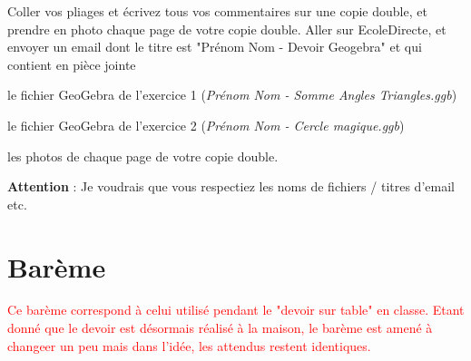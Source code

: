 \documentclass[answers]{exam}
\begin{document}
\begin{questions}

\question Coller vos pliages et écrivez tous vos commentaires sur une copie double, et prendre en photo chaque page de votre copie double.
\question Aller sur EcoleDirecte, et envoyer un email dont le titre est "Prénom Nom - Devoir Geogebra" et qui contient en pièce jointe 
\begin{compactenum}
  \item le fichier GeoGebra de l'exercice 1 (\textit{Prénom Nom - Somme Angles Triangles.ggb}) 
  \item le fichier GeoGebra de l'exercice 2 (\textit{Prénom Nom - Cercle magique.ggb}) 
  \item les photos de chaque page de votre copie double.
\end{compactenum}
\begin{Indication}
  \textbf{Attention} : Je voudrais que vous respectiez les noms de fichiers / titres d'email etc.
\end{Indication}
\end{questions}


\section*{Barème}

\textcolor{red}{Ce barème correspond à celui utilisé pendant le "devoir sur table" en classe. Etant donné que le devoir est désormais réalisé à la maison, le barème est amené à changeer un peu mais dans l'idée, les attendus restent identiques.}

\renewcommand{\arraystretch}{1.7}
\end{document}
